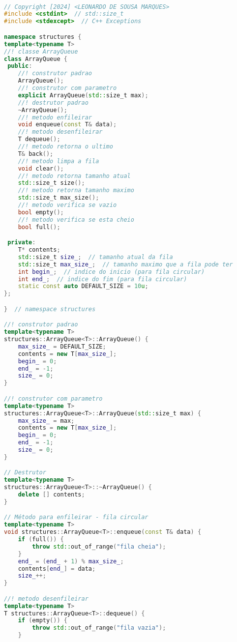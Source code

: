 \\[0.2cm]

\begin{lstlisting}[language=c++]
// Copyright [2024] <LEONARDO DE SOUSA MARQUES>
#include <cstdint>  // std::size_t
#include <stdexcept>  // C++ Exceptions

namespace structures {
template<typename T>
//! classe ArrayQueue
class ArrayQueue {
 public:
    //! construtor padrao
    ArrayQueue();
    //! construtor com parametro
    explicit ArrayQueue(std::size_t max);
    //! destrutor padrao
    ~ArrayQueue();
    //! metodo enfileirar
    void enqueue(const T& data);
    //! metodo desenfileirar
    T dequeue();
    //! metodo retorna o ultimo
    T& back();
    //! metodo limpa a fila
    void clear();
    //! metodo retorna tamanho atual
    std::size_t size();
    //! metodo retorna tamanho maximo
    std::size_t max_size();
    //! metodo verifica se vazio
    bool empty();
    //! metodo verifica se esta cheio
    bool full();

 private:
    T* contents;
    std::size_t size_;  // tamanho atual da fila
    std::size_t max_size_;  // tamanho maximo que a fila pode ter
    int begin_;  // indice do inicio (para fila circular)
    int end_;  // indice do fim (para fila circular)
    static const auto DEFAULT_SIZE = 10u;
};

}  // namespace structures

//! construtor padrao
template<typename T>
structures::ArrayQueue<T>::ArrayQueue() {
    max_size_ = DEFAULT_SIZE;
    contents = new T[max_size_];
    begin_ = 0;
    end_ = -1;
    size_ = 0;
}

//! construtor com parametro
template<typename T>
structures::ArrayQueue<T>::ArrayQueue(std::size_t max) {
    max_size_ = max;
    contents = new T[max_size_];
    begin_ = 0;
    end_ = -1;
    size_ = 0;
}

// Destrutor
template<typename T>
structures::ArrayQueue<T>::~ArrayQueue() {
    delete [] contents;
}

// Método para enfileirar - fila circular
template<typename T>
void structures::ArrayQueue<T>::enqueue(const T& data) {
    if (full()) {
        throw std::out_of_range("fila cheia");
    }
    end_ = (end_ + 1) % max_size_;
    contents[end_] = data;
    size_++;
}

//! metodo desenfileirar
template<typename T>
T structures::ArrayQueue<T>::dequeue() {
    if (empty()) {
        throw std::out_of_range("fila vazia");
    }


\end{lstlisting}
